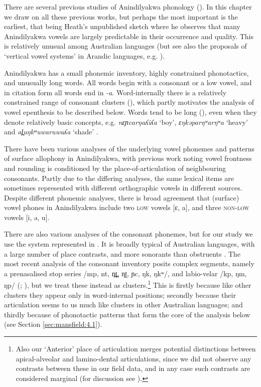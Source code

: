 \documentclass[output=paper,colorlinks,citecolor=brown]{langscibook}
\begin{document}
There are several previous studies of Anindilyakwa phonology (\citealt{Heath:2020aa,Stokes1981,Leeding1989,vanEgmond2012,vanEgmondBaker2020}). In this chapter we draw on all these previous works, but perhaps the most important is the earliest, that being Heath’s unpublished sketch where he observes that many Anindilyakwa vowels are largely predictable in their occurrence and quality. This is relatively unusual among Australian languages (but see also the proposals of ‘vertical vowel systems’ in Arandic languages, e.g. \citealt{breen2005central}).

Anindilyakwa has a small phonemic inventory, highly constrained phonotactics, and unusually long words. All words begin with a consonant or a low vowel, and in citation form all words end in \textit{-a}. Word-internally there is a relatively constrained range of consonant clusters (\citealt{Heath:2020aa,vanEgmond2012}), which partly motivates the analysis of vowel epenthesis to be described below. Words tend to be long (\citealt[68]{Leeding1989}), even when they denote relatively basic concepts, e.g. \textit{nɛɲcarŋaʎiʎa} `boy', \textit{ɛŋkəparŋʷarŋʷa} `heavy' and \textit{al̪uŋkᵚuwaruwaʎa} `shade' .

There have been various analyses of the underlying vowel phonemes and patterns of surface allophony in Anindilyakwa, with previous work noting vowel frontness and rounding is conditioned by the place-of-articulation of neighbouring consonants. Partly due to the differing analyses, the same lexical items are sometimes represented with different orthographic vowels in different sources. Despite different phonemic analyses, there is broad agreement that (surface) vowel phones in Anindilyakwa include two \textsc{low} vowels [ɛ, a], and three \textsc{non-low} vowels [i, ə, u]. 

There are also various analyses of the consonant phonemes, but for our study we use the system represented in . It is broadly typical of Australian languages, with a large number of place contrasts, and more sonorants than obstruents \citep{butcher_placearticulation_2006}. The most recent analysis of the consonant inventory posits complex segments, namely a prenasalised stop series /mp, nt, n̪t̪, ɳʈ, ɲc, ŋk, ŋkʷ/, and labio-velar /kp, ŋm, ŋp/ (\citealt{vanEgmond2012};  \citealt{vanEgmondBaker2020}), but we treat these instead as clusters.\footnote{Also our ‘Anterior’ place of articulation merges potential distinctions between apical-alveolar and lamino-dental articulations, since we did not observe any contrasts between these in our field data, and in any case such contrasts are considered marginal (for discussion see  \citealt{vanEgmond2012}). } 
This is firstly because like other clusters they appear only in word-internal positions; secondly because their articulation seems to us much like clusters in other Australian languages; and thirdly because of phonotactic patterns that form the core of the analysis below (see Section \ref{sec:mansfield:4.1}). 
 
\end{document}
